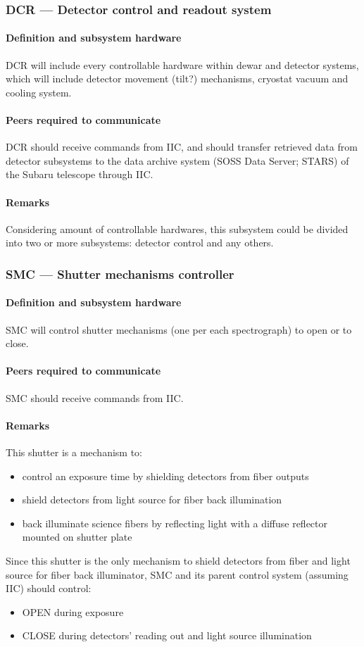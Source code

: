 \documentclass[a4paper,notitlepage]{article}
\begin{document}
\subsubsection{DCR --- Detector control and readout system}
\paragraph{Definition and subsystem hardware}
DCR will include every controllable hardware within dewar and detector systems, 
which will include detector movement (tilt?) mechanisms, cryostat vacuum and 
cooling system. 
\paragraph{Peers required to communicate}
DCR should receive commands from IIC, and should transfer retrieved data from 
detector subsystems to the data archive system (SOSS Data Server; STARS) of 
the Subaru telescope through IIC. 
\paragraph{Remarks}
Considering amount of controllable hardwares, this subsystem could be divided 
into two or more subsystems: detector control and any others. 

\subsubsection{SMC --- Shutter mechanisms controller}
\paragraph{Definition and subsystem hardware}
SMC will control shutter mechanisms (one per each spectrograph) to open or 
to close. 
\paragraph{Peers required to communicate}
SMC should receive commands from IIC. 
\paragraph{Remarks}
This shutter is a mechanism to: 
\begin{itemize}
  \item control an exposure time by shielding detectors from fiber outputs
  \item shield detectors from light source for fiber back illumination
  \item back illuminate science fibers by reflecting light with a diffuse 
    reflector mounted on shutter plate
\end{itemize}
Since this shutter is the only mechanism to shield detectors from fiber and 
light source for fiber back illuminator, SMC and its parent control system 
(assuming IIC) should control: 
\begin{itemize}
  \item OPEN during exposure
  \item CLOSE during detectors' reading out and light source illumination
\end{itemize}
\end{document}
